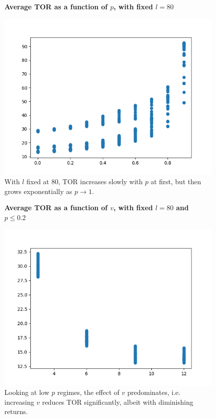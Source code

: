 \documentclass{article}
\begin{document}
\begin{figure}
\textbf{\large Average TOR as a function of $p$, with fixed $l=80$}\par\medskip
{}
\includegraphics[scale = 0.55, left]{./data/phase1/p_vs_timeOnRoad_l=80.png}
\vspace*{0.1cm}\hspace*{4.5cm}{\large $p$}
\caption{\label{fig} With $l$ fixed at 80, TOR increases slowly with $p$ at first, but then grows exponentially as $p \to 1$.}
\end{figure}

\begin{figure}
\textbf{\large Average TOR as a function of $v$, with fixed $l=80$ and $p \leq 0.2$}\par\medskip
{}
\includegraphics[scale = 0.55, left]{./data/phase1/v_vs_timeOnRoad_l=80_lowp.png}
\vspace*{0.1cm}\hspace*{4.5cm}{\large $p$}
\caption{\label{fig} Looking at low $p$ regimes, the effect of $v$ predominates, i.e. increasing $v$ reduces TOR significantly, albeit with diminishing returns.}
\end{figure}
\end{document}
